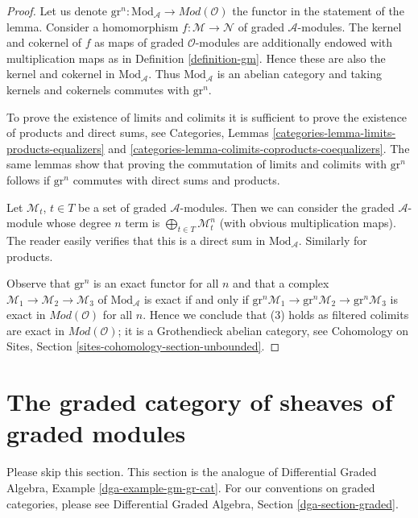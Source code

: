 \begin{proof}
Let us denote
$\text{gr}^n : \text{Mod}_\mathcal{A} \to \textit{Mod}(\mathcal{O})$
the functor in the statement of the lemma.
Consider a homomorphism $f : \mathcal{M} \to \mathcal{N}$
of graded $\mathcal{A}$-modules. The kernel
and cokernel of $f$ as maps of graded $\mathcal{O}$-modules
are additionally endowed with multiplication maps as in
Definition \ref{definition-gm}. Hence these are also
the kernel and cokernel in $\text{Mod}_\mathcal{A}$.
Thus $\text{Mod}_\mathcal{A}$ is an abelian category
and taking kernels and cokernels commutes with $\text{gr}^n$.

\medskip\noindent
To prove the existence of limits and colimits it is sufficient
to prove the existence of products and direct sums, see
Categories, Lemmas \ref{categories-lemma-limits-products-equalizers} and
\ref{categories-lemma-colimits-coproducts-coequalizers}.
The same lemmas show that
proving the commutation of limits and colimits with $\text{gr}^n$
follows if $\text{gr}^n$ commutes with direct sums and products.

\medskip\noindent
Let $\mathcal{M}_t$, $t \in T$ be a set of graded $\mathcal{A}$-modules.
Then we can consider the graded $\mathcal{A}$-module whose degree $n$
term is $\bigoplus_{t \in T} \mathcal{M}_t^n$ (with obvious multiplication
maps). The reader easily verifies that this is a direct sum in
$\text{Mod}_\mathcal{A}$. Similarly for products.

\medskip\noindent
Observe that $\text{gr}^n$ is an exact functor for all $n$ and that
a complex $\mathcal{M}_1 \to \mathcal{M}_2 \to \mathcal{M}_3$
of $\text{Mod}_\mathcal{A}$ is exact if and only if
$\text{gr}^n\mathcal{M}_1 \to \text{gr}^n\mathcal{M}_2 \to
\text{gr}^n\mathcal{M}_3$ is exact in $\textit{Mod}(\mathcal{O})$
for all $n$. Hence we conclude that (3) holds as filtered
colimits are exact in $\textit{Mod}(\mathcal{O})$;
it is a Grothendieck abelian category, see
Cohomology on Sites, Section \ref{sites-cohomology-section-unbounded}.
\end{proof}






\section{The graded category of sheaves of graded modules}
\label{section-gm-gr-cat}

\noindent
Please skip this section. This section is the analogue of
Differential Graded Algebra, Example \ref{dga-example-gm-gr-cat}.
For our conventions on graded categories, please see
Differential Graded Algebra, Section \ref{dga-section-graded}.

